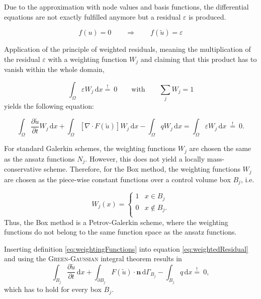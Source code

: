 Due to the approximation with node values and basis functions, the differential equations are not exactly fulfilled anymore but a residual $\varepsilon$ is produced.

\begin{equation}
  f(u) = 0  \qquad \Rightarrow \qquad f(\tilde u) = \varepsilon
\end{equation}

Application of the principle of weighted residuals, meaning the multiplication
of the residual $\varepsilon$ with a weighting function $W_j$  and claiming that
this product has to vanish within the whole domain,

\begin{equation}
  \int_\Omega \varepsilon W_j \, \mathrm{d}x \overset {!}{=} \: 0 \qquad \textrm{with} \qquad \sum_j W_j =1
\end{equation}
yields the following equation:

\begin{equation}
  \int_\Omega \frac{\partial \tilde u}{\partial t} W_j \, \mathrm{d}x + \int_\Omega
   \left[ \nabla \cdot F(\tilde u) \right] W_j  \, \mathrm{d}x - \int_\Omega q W_j \, \mathrm{d}x = \int_\Omega \varepsilon W_j \, \mathrm{d}x \: \overset {!}{=} \: 0.
\label{eq:weightedResidual}
\end{equation}

For standard Galerkin schemes, the weighting functions $W_j$ are chosen the same as the ansatz functions $N_j$. However, this does not yield a locally mass-conservative scheme.
Therefore, for the Box method, the weighting functions $W_j$ are chosen as
the piece-wise constant functions over a
control volume box $B_j$, i.e.

\begin{equation}
  W_j(x) = \begin{cases}
            1 &x \in B_j \\
      0 &x \notin B_j.\\
           \end{cases}
\label{eq:weightingFunctions}
\end{equation}
Thus, the Box method is a Petrov-Galerkin scheme, where the weighting functions do not belong to the same function space as the ansatz functions.

Inserting definition \eqref{eq:weightingFunctions} into equation \eqref{eq:weightedResidual} and using the \textsc{Green-Gaussian} integral theorem results in
\begin{equation}
  \int_{B_j} \frac{\partial \tilde u}{\partial t} \, \mathrm{d}x + \int_{\partial B_j}  F(\tilde u) \cdot \mathbf n \, \mathrm{d}\Gamma_{B_j} - \int_{B_j} q \, \mathrm{d}x  \overset {!}{=} \: 0,
\label{eq:BoxMassBlance}
\end{equation}
which has to hold for every box $B_j$.

